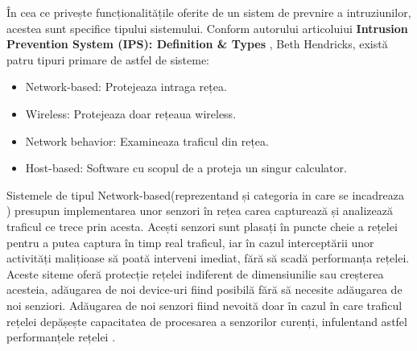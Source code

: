 În cea ce privește funcționalitățile oferite de un sistem de prevnire a intruziunilor, acestea sunt specifice tipului sistemului. Conform autorului articoluiui \textbf{Intrusion Prevention System (IPS): Definition \& Types} \cite{ips_types}, Beth Hendricks,  există patru tipuri primare de astfel de sisteme: 
\begin{itemize}
	\item Network-based: Protejeaza intraga rețea.
	\item Wireless: Protejeaza doar rețeaua wireless.
	\item Network behavior: Examineaza traficul din rețea.
	\item Host-based: Software cu scopul de a proteja un singur calculator.
\end{itemize}

Sistemele de tipul Network-based(reprezentand și categoria in care se incadreaza  \textit{\thesistitle})  presupun implementarea unor senzori în rețea carea capturează și analizează traficul ce trece prin acesta. Acești senzori sunt plasați în puncte cheie a rețelei pentru a putea captura în timp real traficul, iar în cazul interceptării unor activități malițioase să poată interveni imediat, fără să scadă performanța rețelei. Aceste siteme oferă protecție rețelei indiferent de dimensiunilie sau creșterea acesteia, adăugarea de noi device-uri fiind posibilă fără să necesite adăugarea de noi senziori. Adăugarea de noi senzori fiind nevoită doar în cazul în care traficul rețelei depășește capacitatea de procesarea a senzorilor curenți, infulentand astfel performanțele rețelei \cite{impl}.

